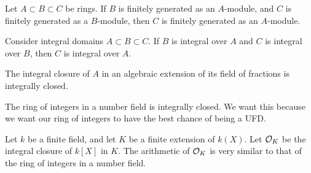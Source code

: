 \documentclass[12pt]{amsart}
\begin{document}
\begin{lemma}
    Let $A \subset B \subset C$ be rings. If $B$ is finitely generated as an $A$-module, and $C$ is finitely generated as a $B$-module, then $C$ is finitely generated as an $A$-module. 
\end{lemma}

\begin{proposition}
    Consider integral domains $A \subset B \subset C$. If $B$ is integral over $A$ and $C$ is integral over $B$, then $C$ is integral over $A$. 
\end{proposition}

\begin{corollary}
    The integral closure of $A$ in an algebraic extension of its field of fractions is integrally closed. 
\end{corollary}

\begin{remark}
    The ring of integers in a number field is integrally closed. We want this because we want our ring of integers to have the best chance of being a UFD. 
\end{remark}

\begin{example}
    Let $k$ be a finite field, and let $K$ be a finite extension of $k(X)$. Let $\mathcal{O}_K$ be the integral closure of $k[X]$ in $K$. The arithmetic of $\mathcal{O}_K$ is very similar to that of the ring of integers in a number field.
\end{example}
\end{document}

